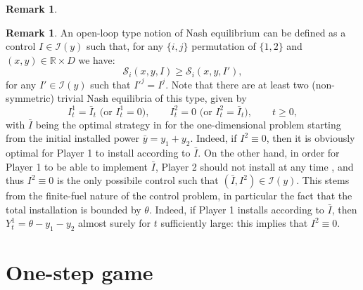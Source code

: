 \documentclass[10pt]{article}
\numberwithin{equation}{section}
\theoremstyle{plain}
\numberwithin{theorem}{section}
\theoremstyle{definition}
\newtheorem{remark}[theorem]{Remark}
\def \R {\mathbb{R}}
\newcommand{\<}{\langle}
\renewcommand{\>}{\rangle}
\renewcommand{\(}{\left(}
\renewcommand{\)}{\right)}
\def \R  {{\mathbb {R}}}
\def \R {{\mathbb {R}}}
\def\cS{{\mathcal S}}
\begin{document}
{{{\begin{remark}
\end{remark}
\begin{remark}
An open-loop type notion of Nash equilibrium can be defined as a control $I\in \mathcal{I}(y)$ such that, for any $\{i,j\}$ permutation of $\{1,2 \}$ and $(x,y)\in\R\times D$ we have:
\begin{equation}\label{eq:nash_equilibrium_open}
\cS_i(x,y,I)\ge \cS_i(x,y,I'), 
\end{equation}
for any $I'\in \mathcal{I}(y)$ such that $I'^j = I^j$. Note that there are at least two (non-symmetric) trivial Nash equilibria of this type, given by 
\begin{equation}%
I^1_t = \bar I_t \text{ (or $I^1_t = 0$)}, \qquad I^2_t = 0\text{ (or $I^2_t = \bar I_t$)}, \qquad t\geq 0,
\end{equation}
with $\bar I$ being the optimal strategy in \cite{MR4305783} for the one-dimensional problem starting from the initial installed power $\bar y = y_1 + y_2$. Indeed, if $I^2 \equiv 0$, then it is obviously optimal for Player 1 to install according to $\bar I$. On the other hand, in order for Player 1 to be able to implement $\bar I$, Player 2 should not install at any time%
, and thus $I^2 \equiv 0$ is the only possibile control such that $(\bar I, I^2)\in \mathcal{I}(y)$. This stems from the finite-fuel nature of the control problem, in particular the fact that the total installation is bounded by $\theta$. Indeed, if Player 1 installs according to $\bar I$, then $Y^1_t = \theta-y_1-y_2$ almost surely for $t$ sufficiently large: this implies that $I^2\equiv 0$.
\end{remark}
}

\section{One-step game}\label{sec:one_step}

}}
\end{document}
